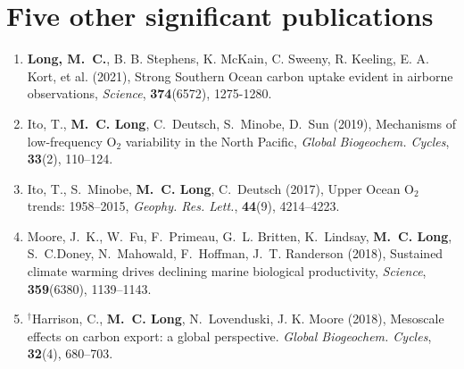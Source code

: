 \documentclass[12pt]{article}
\newcounter{H}
\begin{document}
\section{Five other significant publications}
\begin{enumerate}[leftmargin=1.5em,font=\normalfont]
\setlength{\itemsep}{-0.3em}

\item
\textbf{{Long}, M.~C.}, B. B. Stephens, K. McKain, C. Sweeny, R. Keeling, E. A. Kort, et al.
(2021), Strong Southern Ocean carbon uptake evident in airborne observations, \textit{Science},
\textbf{374}(6572), {1275-1280}.

\item
Ito, T., \textbf{M.~C. Long}, C.~Deutsch, S.~Minobe, D.~Sun (2019), Mechanisms of low-frequency O$_2$ variability in the North Pacific, \textit{Global Biogeochem. Cycles}, \textbf{33}(2), 110--124.

\item
Ito, T., S.~Minobe, \textbf{M.~C. Long}, C.~Deutsch (2017), {Upper Ocean O$_2$ trends: 1958--2015}, \textit{Geophy. Res. Lett.}, \textbf{44}(9), 4214--4223.

\item
Moore, J.~K., W.~Fu, F.~Primeau, G.~L. Britten, K.~Lindsay, \textbf{M.~C. Long},
S.~C.Doney, N.~Mahowald, F.~Hoffman, J.~T. Randerson
(2018), Sustained climate warming drives declining marine biological productivity, \textit{Science}, \textbf{359}(6380), 1139--1143.

\item
$^\dagger$Harrison, C., \textbf{M.~C. Long}, N.~{Lovenduski}, J. K. Moore (2018), {Mesoscale effects on carbon export: a global perspective}. \textit{Global Biogeochem. Cycles}, \textbf{32}(4), 680--703.


\end{enumerate}
\end{document}
